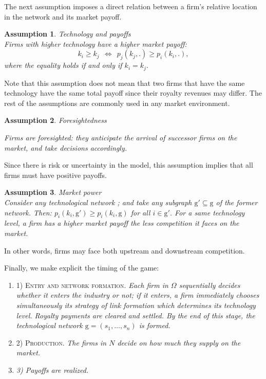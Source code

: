 \documentclass{article}
\newtheorem{assumption}{Assumption}
\begin{document}
\indent The next assumption imposes a direct relation between a firm's relative location in the network and its market payoff.\\  

\begin{assumption}{Technology and payoffs} \label{ass1}\\
Firms with higher technology have a higher market payoff:
\begin{equation*}
     k_i\geq k_j~~ \Leftrightarrow ~~ p_j(k_j,.)\geq  p_i(k_i,.),
\end{equation*}
where the equality holds if and only if $k_i=k_j$.
\end{assumption}

Note that this assumption does not mean that two firms that have the same technology have the same total payoff since their royalty revenues may differ. The rest of the assumptions are commonly used in any market environment. \\

\begin{assumption}{Foresightedness} \label{ass2}

Firms are foresighted: they anticipate the arrival of successor firms on the market, and take decisions accordingly. \\ 
\end{assumption}

Since there is risk or uncertainty in the model, this assumption implies that all firms must have positive payoffs. 

\begin{assumption}{Market power}\label{ass3}\\
Consider any technological network ; and take any subgraph $\text{g}'\subseteq \text{g}$ of the former network. Then: $p_i(k_i,\text{g}')\geq p_i(k_i,\text{g})$ for all $i\in \text{g}'$. For a same technology level, a firm has a higher market payoff the less competition it faces on the market.  \\
\end{assumption}

In other words, firms may face both upstream and downstream competition. 

\indent Finally, we make explicit the timing of the game:       

\begin{enumerate}
    \item[] \textsc{1) Entry and network formation.} \textit{Each firm in $\Omega$ sequentially decides whether it enters the industry or not; if it enters, a firm immediately chooses simultaneously its strategy of link formation which determines its technology level. Royalty payments are cleared and settled. By the end of this stage, the technological network $\text{g}=(s_1,\ldots,s_n)$ is formed. }
    \item[] \textsc{2) Production.} \textit{The firms in $N$ decide on how much they supply on the market.}
    \item[] \textit{3) Payoffs are realized.}
\end{enumerate}
\end{document}

